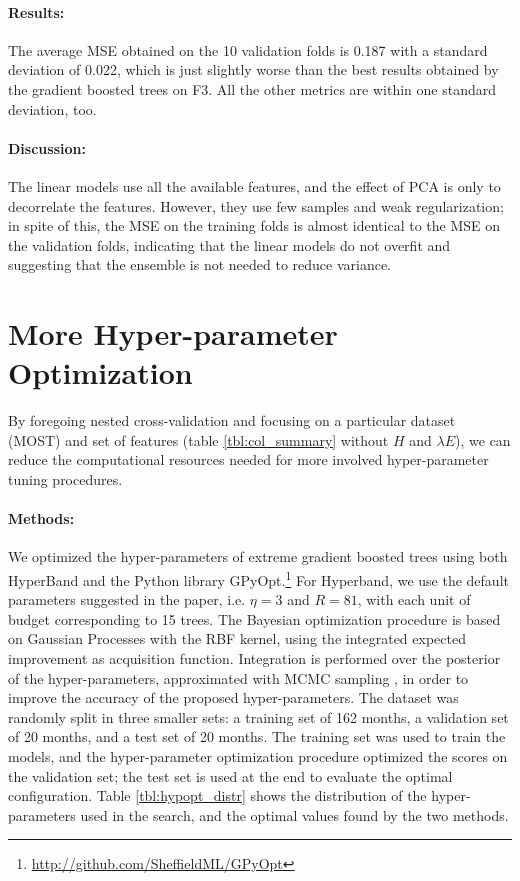 \documentclass[a4paper,11pt]{kth-mag}
\begin{document}
\paragraph{Results:} The average MSE obtained on the 10 validation folds is 0.187 with a standard deviation of 0.022, which is just slightly worse than the best results obtained by the gradient boosted trees on F3. All the other metrics are within one standard deviation, too.

\paragraph{Discussion:} The linear models use all the available features, and the effect of PCA is only to decorrelate the features. However, they use few samples and weak regularization; in spite of this, the MSE on the training folds is almost identical to the MSE on the validation folds, indicating that the linear models do not overfit and suggesting that the ensemble is not needed to reduce variance.



\section{More Hyper-parameter Optimization}
\label{apx:hyperopt}
By foregoing nested cross-validation and focusing on a particular dataset (MOST) and set of features (table \ref{tbl:col_summary} without $H$ and $\lambda E$), we can reduce the computational resources needed for more involved hyper-parameter tuning procedures.

\paragraph{Methods:} We optimized the hyper-parameters of extreme gradient boosted trees \citep{xgboost} using both HyperBand \citep{hyperband} and the Python library GPyOpt.\footnote{\url{http://github.com/SheffieldML/GPyOpt}} For Hyperband, we use the default parameters suggested in the paper, i.e. $\eta=3$ and $R=81$, with each unit of budget corresponding to 15 trees. The Bayesian optimization procedure is based on Gaussian Processes with the RBF kernel, using the integrated expected improvement as acquisition function. Integration is performed over the posterior of the hyper-parameters, approximated with MCMC sampling \citep{practical_gphypopt}, in order to improve the accuracy of the proposed hyper-parameters. The dataset was randomly split in three smaller sets: a training set of 162 months, a validation set of 20 months, and a test set of 20 months. The training set was used to train the models, and the hyper-parameter optimization procedure optimized the scores on the validation set; the test set is used at the end to evaluate the optimal configuration. Table \ref{tbl:hypopt_distr} shows the distribution of the hyper-parameters used in the search, and the optimal values found by the two methods.
\end{document}
